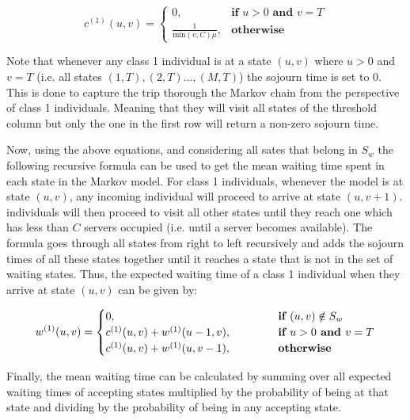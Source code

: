 \begin{equation} \label{eq:sojourn_others}
    c^{(1)}(u,v) = 
    \begin{cases}
        0, & \textbf{if } u > 0 \textbf{ and } v = T \\
        \frac{1}{\text{min}(v,C)\mu}, & \textbf{otherwise}
    \end{cases}
\end{equation}

Note that whenever any class 1 individual is at a state \((u,v)\) where 
\(u > 0\) 
and \(v = T\) (i.e. all states \((1,T), (2,T) \dots, (M,T)\)) the sojourn time is 
set to \(0\). 
This is done to capture the trip thorough the Markov chain from the perspective 
of class 1 individuals. 
Meaning that they will visit all states of the threshold column but only the one 
in the first row will return a non-zero sojourn time.

Now, using the above equations, and considering all sates that belong in \(S_w\) 
the following recursive formula can be used to get the mean waiting time spent in 
each state in the Markov model. 
For class 1 individuals, whenever the model is at state \( (u,v) \), any 
incoming 
individual will proceed to arrive at state \( (u, v+1) \). 
individuals will then proceed to visit all other states until they reach one which 
has less than \(C\) servers occupied (i.e. until a server becomes available). 
The formula goes through all states from right to left recursively and adds the 
sojourn times of all these states together until it reaches a state that is not 
in the set of waiting states. 
Thus, the expected waiting time of a class 1 individual when they arrive at 
state \( (u,v) \) can be given by:

\begin{equation} \label{eq:waiting-time-at-each-state-other}
    w^{(1)}(u,v) = 
    \begin{cases} 
        0, \hspace{4.85cm} & \textbf{if } (u,v) \notin S_w \\
        c^{(1)}(u,v) + w^{(1)}(u-1, v), & \textbf{if } u > 0 \textbf{ and } v = T \\
        c^{(1)}(u,v) + w^{(1)}(u, v-1), & \textbf{otherwise}
    \end{cases}
\end{equation}

Finally, the mean waiting time can be calculated by summing over all expected 
waiting times of accepting states multiplied by the probability of being at that 
state and dividing by the probability of being in any accepting state.

